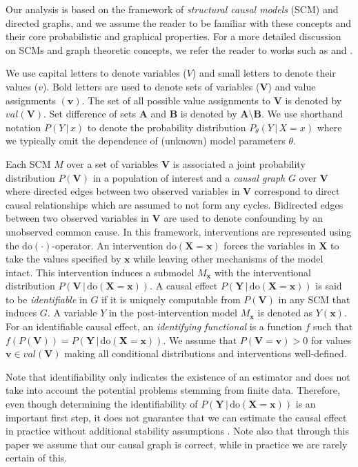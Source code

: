 \documentclass[11pt,a4paper,twoside]{article}
\newcommand{\+}[1]{\ensuremath{\mathbf{#1}}}
\newcommand{\po}[2]{#1(#2)}
\newcommand{\doo}{\textrm{do}}
\newcommand{\given}{{ \, | \, }}
\begin{document}
	Our analysis is based on the framework of \emph{structural causal models} (SCM) and directed graphs, and we assume the reader to be familiar with these concepts and their core probabilistic and graphical properties. For a more detailed discussion on SCMs and graph theoretic concepts, we refer the reader to works such as \citep{Pearl:book2009} and \citep{Koller09}. 
	
	We use capital letters to denote variables ($V$) and small letters to denote their values ($v$). Bold letters are used to denote sets of variables ($\+V$) and value assignments $(\+ v)$. The set of all possible value assignments to $\+ V$ is denoted by $val(\+ V)$. Set difference of sets $\+ A$ and $\+ B$ is denoted by $\+ A \setminus \+ B$. We use shorthand notation  $P(Y \given x)$ to denote the probability distribution $P_{\theta}(Y \given X = x)$ where we typically omit the dependence of (unknown) model parameters $\theta$.
	
	Each SCM $M$ over a set of variables $\+ V$ is associated a joint probability distribution $P(\+V)$ in a population of interest and a \emph{causal graph} $G$ over $\+ V$ where directed edges between two observed variables in $\+ V$ correspond to direct causal relationships which are assumed to not form any cycles. Bidirected edges between two observed variables in $\+ V$ are used to denote confounding by an unobserved common cause. In this framework, interventions are represented using the $\doo(\cdot)$-operator. An intervention $\doo(\+ X = \+x)$ forces the variables in $\+ X$ to take the values specified by $\+ x$ while leaving other mechanisms of the model intact. This intervention induces a submodel $M_{\+ x}$ with the interventional distribution $P(\+ V \given \doo(\+ X = \+ x))$. A causal effect $P(\+ Y \given \doo(\+ X = \+ x))$ is said to be \emph{identifiable} in $G$ if it is uniquely computable from $P(\+ V)$ in any SCM that induces $G$. A variable $Y$ in the post-intervention model $M_{\+ x}$ is denoted as $\po{Y}{\+ x}$. For an identifiable causal effect, an \emph{identifying functional} is a function $f$ such that $f(P(\+ V)) = P(\+ Y \given \doo(\+ X = \+ x))$. We assume that $P(\+ V = \+ v) > 0$ for values $\+ v \in val(\+ V)$ making all conditional distributions and interventions well-defined. 
	
	Note that identifiability only indicates the existence of an estimator and does not take into account the potential problems stemming from finite data. Therefore, even though determining the identifiability of $P(\+ Y \given \doo(\+ X = \+ x))$ is an important first step, it does not guarantee that we can estimate the causal effect in practice without additional stability assumptions \citep{maclaren2019}. Note also that through this paper we assume that our causal graph is correct, while in practice we are rarely certain of this.
	
\end{document}

